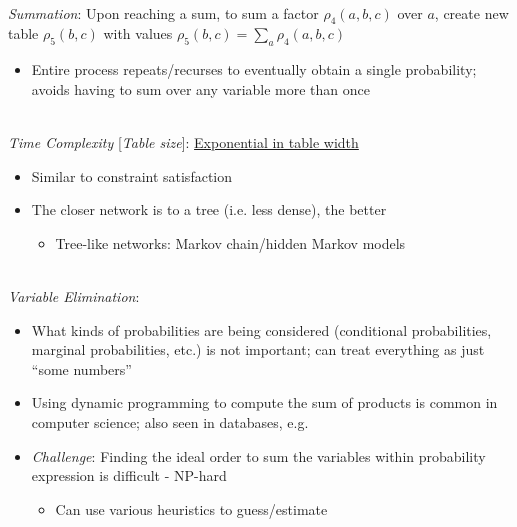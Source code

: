 \documentclass[12pt]{extarticle}
\theoremstyle{definition}
\theoremstyle{remark}
\newcommand{\pstart}[0]{\noindent}
\newcommand{\newp}[0]{~\\ \pstart}
\begin{document}
\newp
\textit{Summation}: Upon reaching a sum, to sum a factor $\rho_4(a,b,c)$ over $a$, create new table $\rho_5(b,c)$ with values $\rho_5(b,c)=\sum_a\rho_4(a,b,c)$ \begin{itemize}
    \item Entire process repeats/recurses to eventually obtain a single probability; avoids having to sum over any variable more than once
\end{itemize}

\newp
\textit{Time Complexity} [\textit{Table size}]: \ul{Exponential in table width} \begin{itemize}
    \item Similar to constraint satisfaction
    \item The closer network is to a tree (i.e. less dense), the better \begin{itemize}
        \item Tree-like networks: Markov chain/hidden Markov models
    \end{itemize}
\end{itemize}

\newp
\textit{Variable Elimination}:
\begin{itemize}
    \item What kinds of probabilities are being considered (conditional probabilities, marginal probabilities, etc.) is not important; can treat everything as just ``some numbers''
    \item Using dynamic programming to compute the sum of products is common in computer science; also seen in databases, e.g.
    \item \textit{Challenge}: Finding the ideal order to sum the variables within probability expression is difficult - NP-hard \begin{itemize}
        \item Can use various heuristics to guess/estimate
    \end{itemize}
\end{itemize}
\end{document}
